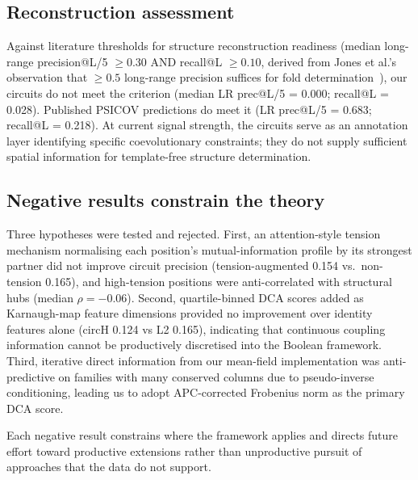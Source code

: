 \subsection{Reconstruction assessment}
\label{sec:res-reconstruction}

Against literature thresholds for structure reconstruction readiness (median
long-range precision@L/5 $\geq 0.30$ AND recall@L $\geq 0.10$, derived from
Jones et al.'s observation that $\geq 0.5$ long-range precision suffices for
fold determination~\cite{jones2012}), our circuits do not meet the criterion
(median LR prec@L/5 = 0.000; recall@L = 0.028).  Published PSICOV predictions
do meet it (LR prec@L/5 = 0.683; recall@L = 0.218).  At current signal
strength, the circuits serve as an annotation layer identifying specific
coevolutionary constraints; they do not supply sufficient spatial information
for template-free structure determination.

\subsection{Negative results constrain the theory}
\label{sec:res-negative}

Three hypotheses were tested and rejected.  First, an attention-style tension
mechanism normalising each position's mutual-information profile by its
strongest partner did not improve circuit precision (tension-augmented 0.154
vs.\ non-tension 0.165), and high-tension positions were anti-correlated with
structural hubs (median $\rho = -0.06$).  Second, quartile-binned DCA scores
added as Karnaugh-map feature dimensions provided no improvement over identity
features alone (circH 0.124 vs L2 0.165), indicating that continuous coupling
information cannot be productively discretised into the Boolean framework.
Third, iterative direct information from our mean-field implementation was
anti-predictive on families with many conserved columns due to pseudo-inverse
conditioning, leading us to adopt APC-corrected Frobenius norm as the primary
DCA score.

Each negative result constrains where the framework applies and directs future
effort toward productive extensions rather than unproductive pursuit of
approaches that the data do not support.

